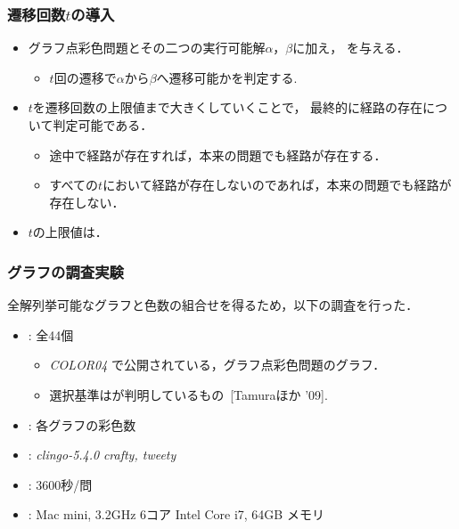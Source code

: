 
\begin{frame}\frametitle{遷移回数$t$の導入}

  \begin{itemize}
    \item グラフ点彩色問題とその二つの実行可能解$\alpha$，$\beta$に加え， 
          を与える．
    \begin{itemize}
      \item $t$回の遷移で$\alpha$から$\beta$へ遷移可能かを判定する. 
    \end{itemize}
    \item $t$を遷移回数の上限値まで大きくしていくことで，
          最終的に経路の存在について判定可能である．
    \begin{itemize}
      \item 途中で経路が存在すれば，本来の問題でも経路が存在する．
      \item すべての$t$において経路が存在しないのであれば，本来の問題でも経路が存在しない．
    \end{itemize}
    \item $t$の上限値は．
  \end{itemize}
  
\end{frame}


\begin{frame}\frametitle{グラフの調査実験}
  全解列挙可能なグラフと色数の組合せを得るため，以下の調査を行った．
  \begin{itemize}
    \item {}: 全44個
    \begin{itemize}
      \item \textit{COLOR04}
      で公開されている，グラフ点彩色問題のグラフ．
      \item 選択基準はが判明しているもの~[Tamuraほか '09].
    \end{itemize}
    \item {}: 各グラフの彩色数

    \item {}: \textit{clingo-5.4.0} \textit{crafty, tweety}
    \item {}: 3600秒/問
    \item {}: Mac mini, 3.2GHz 6コア Intel Core i7, 64GB メモリ
  \end{itemize}
  
\end{frame}

